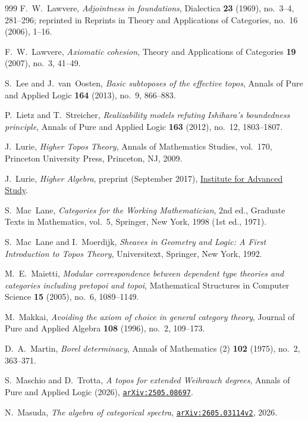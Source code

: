 \documentclass[10pt,twoside,openright]{book}
\theoremstyle{crmplain}
\theoremstyle{crmdef}
\theoremstyle{crmremark}
\begin{document}
\begin{thebibliography}{999}
F.~W.~Lawvere,
\emph{Adjointness in foundations},
Dialectica \textbf{23} (1969), no.~3--4, 281--296; reprinted in Reprints in Theory and Applications of Categories, no.~16 (2006), 1--16.

F.~W.~Lawvere,
\emph{Axiomatic cohesion},
Theory and Applications of Categories \textbf{19} (2007), no.~3, 41--49.

S.~Lee and J.~van~Oosten,
\emph{Basic subtoposes of the effective topos},
Annals of Pure and Applied Logic \textbf{164} (2013), no.~9, 866--883.

P.~Lietz and T.~Streicher,
\emph{Realizability models refuting Ishihara's boundedness principle},
Annals of Pure and Applied Logic \textbf{163} (2012), no.~12, 1803--1807.

J.~Lurie,
\emph{Higher Topos Theory},
Annals of Mathematics Studies, vol.~170, Princeton University Press, Princeton, NJ, 2009.

J.~Lurie,
\emph{Higher Algebra},
preprint (September 2017), \href{https://www.math.ias.edu/~lurie/papers/HigherAlgebra.pdf}{Institute for Advanced Study}.

S.~Mac~Lane,
\emph{Categories for the Working Mathematician},
2nd ed., Graduate Texts in Mathematics, vol.~5, Springer, New York, 1998 (1st ed., 1971).

S.~Mac~Lane and I.~Moerdijk,
\emph{Sheaves in Geometry and Logic: A First Introduction to Topos Theory},
Universitext, Springer, New York, 1992.

M.~E.~Maietti,
\emph{Modular correspondence between dependent type theories and categories including pretopoi and topoi},
Mathematical Structures in Computer Science \textbf{15} (2005), no.~6, 1089--1149.

M.~Makkai,
\emph{Avoiding the axiom of choice in general category theory},
Journal of Pure and Applied Algebra \textbf{108} (1996), no.~2, 109--173.

D.~A.~Martin,
\emph{Borel determinacy},
Annals of Mathematics (2) \textbf{102} (1975), no.~2, 363--371.

S.~Maschio and D.~Trotta,
\emph{A topos for extended Weihrauch degrees},
Annals of Pure and Applied Logic (2026), \href{https://arxiv.org/abs/2505.08697}{\texttt{arXiv:2505.08697}}.

N.~Masuda,
\emph{The algebra of categorical spectra},
\href{https://arxiv.org/abs/2605.03114v2}{\texttt{arXiv:2605.03114v2}}, 2026.


\end{thebibliography}
\end{document}
